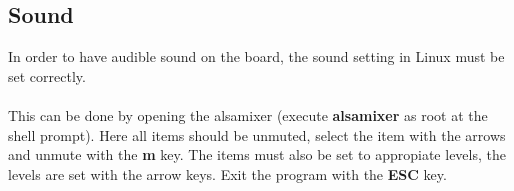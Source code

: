 \subsection{Sound}
\label{sec:alsa}

In order to have audible sound on the board, the sound setting in Linux must be 
set correctly. \\
\\
This can be done by opening the alsamixer 
(execute {\bf alsamixer} as root at the shell prompt).
Here all items should be unmuted, select the item with the arrows 
and unmute with the {\bf m} key.
The items must also be set to appropiate levels, the levels are 
set with the arrow keys. 
Exit the program with the {\bf ESC} key.

